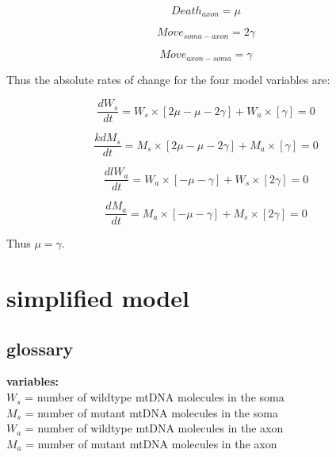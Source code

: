 \documentclass[]{article}
\begin{document}
	\begin{equation}
		Death_{axon} = \mu
	\end{equation}
		
	\begin{equation}
		Move_{soma-axon} = 2\gamma
	\end{equation}
	
	\begin{equation}
		Move_{axon-soma} = \gamma
	\end{equation}

	Thus the absolute rates of change for the four model variables are:
	
	\begin{equation}
		\frac{d W_s}{d t} = W_s \times [ 2\mu -\mu - 2\gamma] + W_a \times [\gamma] = 0
	\end{equation}

	\begin{equation}
		\frac{kd M_s}{d t} = M_s \times [ 2\mu -\mu - 2\gamma] + M_a \times [\gamma] = 0
	\end{equation}

	\begin{equation}
		\frac{dl W_a}{d t} = W_a \times [- \mu - \gamma ] + W_s \times [2\gamma] = 0
	\end{equation}
	
	\begin{equation}
		\frac{d M_a}{d t} = M_a \times [- \mu - \gamma ] + M_s \times [2\gamma] = 0
	\end{equation}
	
	Thus $\mu = \gamma$.
	


\section{simplified model}

\subsection{glossary}

\noindent \textbf{variables:} \\
$W_s$ = number of wildtype mtDNA molecules in the soma \\
$M_s$ = number of mutant mtDNA molecules in the soma \\
$W_a$ = number of wildtype mtDNA molecules in the axon \\
$M_a$ = number of mutant mtDNA molecules in the axon \\
\end{document}
